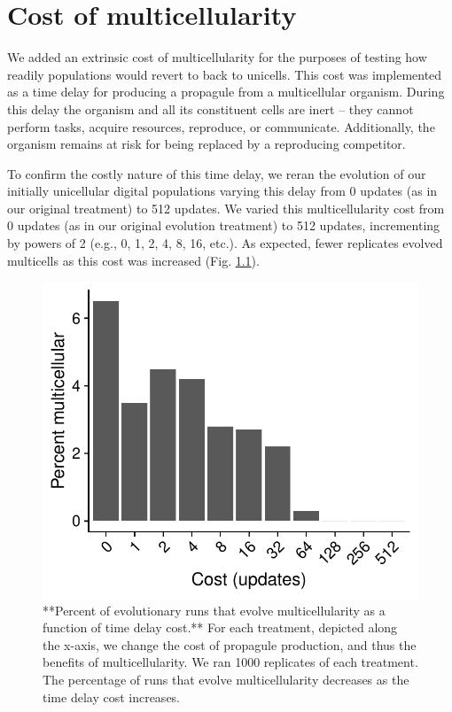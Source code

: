 \documentclass[
]{book}
\begin{document}
\hypertarget{cost-of-multicellularity}{%
\chapter{Cost of multicellularity}\label{cost-of-multicellularity}}

We added an extrinsic cost of multicellularity for the purposes of testing how readily populations would revert to back to unicells. This cost was implemented as a time delay for producing a propagule from a multicellular organism. During this delay the organism and all its constituent cells are inert -- they cannot perform tasks, acquire resources, reproduce, or communicate. Additionally, the organism remains at risk for being replaced by a reproducing competitor.

To confirm the costly nature of this time delay, we reran the evolution of our initially unicellular digital populations varying this delay from 0 updates (as in our original treatment) to 512 updates. We varied this multicellularity cost from 0 updates (as in our original evolution treatment) to 512 updates, incrementing by powers of 2 (e.g., 0, 1, 2, 4, 8, 16, etc.). As expected, fewer replicates evolved multicells as this cost was increased (Fig. \ref{fig:multi-cost}).

\begin{figure}
\includegraphics[width=600px]{images/Percent_multi_by_cost} \caption{**Percent of evolutionary runs that evolve multicellularity as a function of time delay cost.** For each treatment, depicted along the x-axis, we change the cost of propagule production, and thus the benefits of multicellularity. We ran 1000 replicates of each treatment. The percentage of runs that evolve multicellularity decreases as the time delay cost increases.}\label{fig:multi-cost}
\end{figure}
\end{document}
